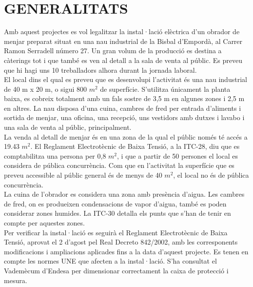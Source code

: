 \chapter{\uppercase{Generalitats}}

Amb aquest projectes es vol legalitzar la instal·lació elèctrica d'un obrador de menjar preparat situat en una nau industrial de la Bisbal d'Empordà, al Carrer Ramon Serradell número 27. Un gran volum de la producció es destina a càterings tot i que també es ven al detall a la sala de venta al públic. Es preveu que hi hagi uns 10 treballadors alhora durant la jornada laboral.\\
\newline
El local dins el qual es preveu que es desenvolupi l'activitat és una nau industrial de 40 m x 20 m, o sigui 800 $m^{2}$ de superfície. S'utilitza únicament la planta baixa, es cobreix totalment amb un fals sostre de 3,5 m en algunes zones i 2,5 m en altres. La nau disposa d'una cuina, cambres de fred per entrada d'aliments i sortida de menjar, una oficina, una recepció, uns vestidors amb dutxes i lavabo i una sala de venta al públic, principalment.\\
\newline
La venda al detall de menjar és en una zona de la qual el públic només té accés a 19.43 $m^{2}$. El Reglament Electrotècnic de Baixa Tensió, a la ITC-28, diu que es comptabilitza una persona per 0,8 $m^{2}$, i que a partir de 50 persones el local es considera de pública concurrència. Com que en l'activitat la superfície que es preveu accessible al públic general és de menys de 40 $m^{2}$, el local no és de pública concurrència.\\
\newline La cuina de l'obrador es considera una zona amb presència d'aigua. Les cambres de fred, on es produeixen condensacions de vapor d'aigua, també es poden considerar zones humides. La ITC-30 detalla els punts que s'han de tenir en compte per aquestes zones.\\
\newline
Per verificar la instal·lació es seguirà el Reglament Electrotècnic de Baixa Tensió, aprovat el 2 d'agost pel Real Decreto 842/2002, amb les corresponents modificacions i ampliacions aplicades fins a la data d'aquest projecte. Es tenen en compte les normes UNE que afecten a la instal·lació. S'ha consultat el Vademècum d'Endesa per dimensionar correctament la caixa de protecció i mesura.




\clearpage